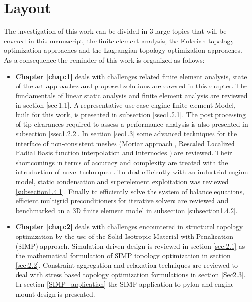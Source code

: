 \section*{Layout}
The investigation of this work can be divided in 3 large topics that will be covered in this manuscript, the finite element analysis, the Eulerian topology optimization approaches and the Lagrangian topology optimization approaches.
As a consequence the reminder of this work is organized as follows:
\begin{itemize}
\item \textbf{Chapter \ref{chap:1}} deals with challenges related finite element analysis, state of the art approaches and proposed solutions are covered in this chapter.  The fundamentals of linear static analysis and finite element analysis are reviewed in section \ref{sec:1.1}. A representative use case engine finite element Model,  built for this work, is presented in subsection \ref{ssec1.2.1}. The post processing of tip clearances required to assess a performance analysis is also presented in subsection \ref{ssec1.2.2}.  In section \ref{sec1.3} some advanced techniques for the interface of non-consistent meshes (Mortar approach \cite{bernardi1989new}, Rescaled Localized Radial Basis function interpolation \cite{deparis2014rescaled} and Internodes \cite{deparis2016internodes}) are reviewed. Their shortcomings in terms of accuracy and complexity are treated with the introduction of novel techniques \cite{coniglio2018weighted}. To deal efficiently with an industrial engine model, static condensation and superelement exploitation was reviewed \ref{subsection1.4.1}. Finally to efficiently solve the system of balance equations, efficient multigrid preconditioners for iterative solvers are reviewed and benchmarked on a 3D finite element model in subsection \ref{subsection1.4.2}. 
\item \textbf{Chapter \ref{chap:2}} deals with challenges encountered in structural topology optimization by the use of the Solid Isotropic Material with Penalization (SIMP) approach. Simulation driven design is reviewed in section \ref{sec:2.1} as the mathematical formulation of SIMP topology optimization in section \ref{sec:2.2}. Constraint aggregation and relaxation techniques are reviewed to deal with stress based topology optimization formulations in section \ref{Sec2.3}.
In section \ref{SIMP_application} the SIMP application to pylon and engine mount design is presented.

\end{itemize}
